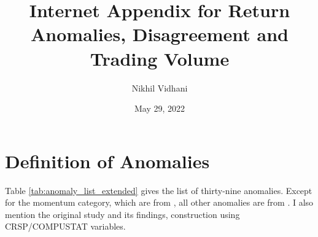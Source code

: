 \documentclass[
  11pt,
  a4paper,
  twoside,
  onecolumn]{article}
\title{Internet Appendix for Return Anomalies, Disagreement and Trading
Volume}
\author{Nikhil Vidhani}
\date{May 29, 2022}
\begin{document}
\maketitle

\renewcommand\bibsection{}



\renewcommand{\thesection}{IA.\arabic{section}}
\renewcommand{\thesubsection}{IA.\arabic{section}.\arabic{subsection}}
\renewcommand{\thesubsubsection}{IA.\arabic{section}.\arabic{subsection}.\arabic{subsubsection}}

\setcounter{page}{1}
\setcounter{figure}{0}
\setcounter{table}{0}
\setcounter{equation}{0}

\renewcommand{\thepage}{IA\textendash\arabic{page}}
\renewcommand\thefigure{IA.\arabic{figure}}    
\renewcommand\thetable{IA.\arabic{table}}    
\renewcommand\theequation{IA.\arabic{equation}}

\hypertarget{definition-of-anomalies}{%
\section{Definition of Anomalies}\label{definition-of-anomalies}}

Table \ref{tab:anomaly_list_extended} gives the list of thirty-nine
anomalies. Except for the momentum category, which are from
\cite{mclean_pontiff2016}, all other anomalies are from
\cite{roberts2018}. I also mention the original study and its findings,
construction using CRSP/COMPUSTAT variables.
\end{document}
